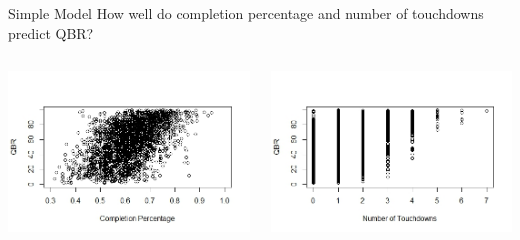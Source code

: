 \documentclass{beamer}
\begin{document}
	\begin{frame}{Simple Model}
		How well do completion percentage and number of touchdowns predict QBR?
		\begin{columns}
			\begin{column}[t]{.5\textwidth}
				\includegraphics[scale=.45]{scatter1.jpeg}
			\end{column}
			\begin{column}[t]{.5\textwidth}
				\includegraphics[scale=.45]{scatter2.jpeg}
			\end{column}
		\end{columns}
	\end{frame}
\end{document}
